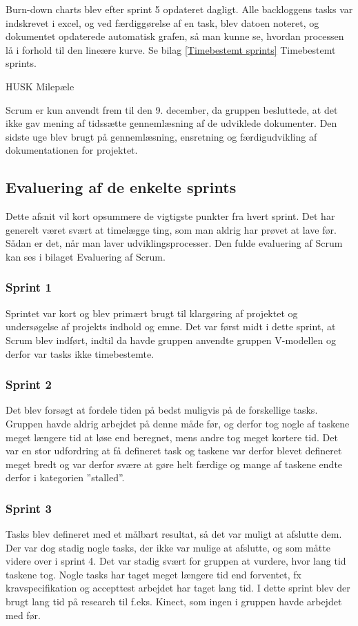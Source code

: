 Burn-down charts blev efter sprint 5 opdateret dagligt. Alle backloggens tasks var indskrevet i excel, og ved færdiggørelse af en task, blev datoen noteret, og dokumentet opdaterede automatisk grafen, så man kunne se, hvordan processen lå i forhold til den lineære kurve. Se bilag \ref{Timebestemt sprints} Timebestemt sprints. 

HUSK Milepæle

Scrum er kun anvendt frem til den 9. december, da gruppen besluttede, at det ikke gav mening af tidssætte gennemlæsning af de udviklede dokumenter. Den sidste uge blev brugt på gennemlæsning, ensretning og færdigudvikling af dokumentationen for projektet.  


\subsection{Evaluering af de enkelte sprints} 
 Dette afsnit vil kort opsummere de vigtigste punkter fra hvert sprint. Det har generelt været svært at timelægge ting, som man aldrig har prøvet at lave før. Sådan er det, når man laver udviklingsprocesser. Den fulde evaluering af Scrum kan ses i bilaget Evaluering af Scrum.

\subsubsection{Sprint 1} 
Sprintet var kort og blev primært brugt til klargøring af projektet og undersøgelse af projekts indhold og emne. Det var først midt i dette sprint, at Scrum blev indført, indtil da havde gruppen anvendte gruppen V-modellen og derfor var tasks ikke timebestemte.

\subsubsection{Sprint 2} 
Det blev forsøgt at fordele tiden på bedst muligvis på de forskellige tasks. Gruppen havde aldrig arbejdet på denne måde før, og derfor tog nogle af taskene meget længere tid at løse end beregnet, mens andre tog meget kortere tid. Det var en stor udfordring at få defineret task og taskene var derfor blevet defineret meget bredt og var derfor svære at gøre helt færdige og mange af taskene endte derfor i kategorien ”stalled”. 

\subsubsection{Sprint 3} 
Tasks blev defineret med et målbart resultat, så det var muligt at afslutte dem. Der var dog stadig nogle tasks, der ikke var mulige at afslutte, og som måtte videre over i sprint 4. Det var stadig svært for gruppen at vurdere, hvor lang tid taskene tog. Nogle tasks har taget meget længere tid end forventet, fx kravspecifikation og accepttest arbejdet har taget lang tid. I dette sprint blev der brugt lang tid på research til f.eks. Kinect, som ingen i gruppen havde arbejdet med før.
 
